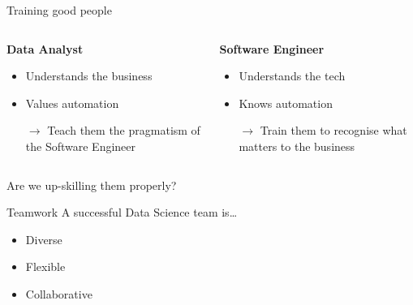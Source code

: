 \documentclass[12pt,aspectratio=169]{beamer}
\begin{document}
\begin{frame}{Training good people}
    \vspace{2.5em}
    \begin{columns}
        \begin{column}{0.5\textwidth}
            \centering%
            {\Large\bf%
             Data Analyst} \\[\medskipamount]
            \begin{itemize}
                \setlength{\itemsep}{\medskipamount}
                \item Understands the business
                \item Values automation
                \item[$\to$] Teach them the pragmatism of the Software Engineer
            \end{itemize}
        \end{column}
        \begin{column}{0.5\textwidth}
            \centering%
            {\Large\bf%
             Software Engineer} \\[\medskipamount]
            \begin{itemize}
                \setlength{\itemsep}{\medskipamount}
                \item Understands the tech
                \item Knows automation
                \item[$\to$] Train them to recognise what matters to the
                             business
            \end{itemize}
        \end{column}
    \end{columns}
    \pause
    \begin{center}
        \Large%
        Are we up\hyp{}skilling them properly?
    \end{center}
\end{frame}

\begin{frame}{Teamwork}
    \Large%
    A successful Data Science team is\ldots
    \begin{itemize}
        \setlength{\itemsep}{\medskipamount}
        \item Diverse
        \item Flexible
        \item Collaborative
    \end{itemize}
\end{frame}
\end{document}

